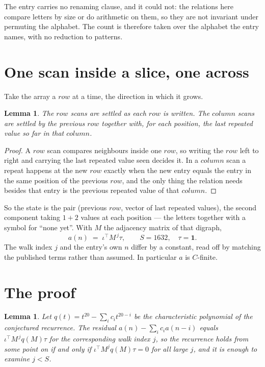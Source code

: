\documentclass[11pt,a4paper]{article}
\theoremstyle{plain}
\newtheorem{lemma}[theorem]{Lemma}
\theoremstyle{definition}
\begin{document}
The entry carries no renaming clause, and it could not: the relations here compare letters by
size or do arithmetic on them, so they are not invariant under permuting the alphabet. The
count is therefore taken over the alphabet the entry names, with no reduction to patterns.

\section{One scan inside a slice, one across}

Take the array a $row$ at a time, the direction in which it grows.

\begin{lemma}\label{lem:state}
The $row$ scans are settled as each $row$ is written. The $column$ scans are
settled by the previous $row$ together with, for each position, the last repeated value
so far in that $column$.
\end{lemma}

\begin{proof}
A $row$ scan compares neighbours inside one $row$, so writing the
$row$ left to right and carrying the last repeated value seen decides it. In a
$column$ scan a repeat happens at the new $row$ exactly when the new entry equals the
entry in the same position of the previous $row$, and the only thing the relation needs
besides that entry is the previous repeated value of that $column$.
\end{proof}

So the state is the pair (previous $row$, vector of last repeated values), the second
component taking $1+2$ values at each position --- the letters together with a symbol for
``none yet''. With $M$ the adjacency matrix of that digraph,
\[
a(n)\;=\;\iota^{\!\top}M^{\,j}\tau ,\qquad S=1632,\quad\tau=\mathbf{1} .
\]
The walk index $j$ and the entry's own $n$ differ by a constant, read off by matching the
published terms rather than assumed. In particular $a$ is $C$-finite.

\section{The proof}

\begin{lemma}\label{lem:crit}
Let $q(t)=t^{20}-\sum_i c_it^{20-i}$ be the characteristic polynomial of the
conjectured recurrence. The residual $a(n)-\sum_ic_ia(n-i)$ equals
$\iota^{\!\top}M^{\,j}q(M)\tau$ for the corresponding walk index $j$, so the recurrence
holds from some point on if and only if $\iota^{\!\top}M^{j}q(M)\tau=0$ for all large $j$,
and it is enough to examine $j<S$.
\end{lemma}
\end{document}
